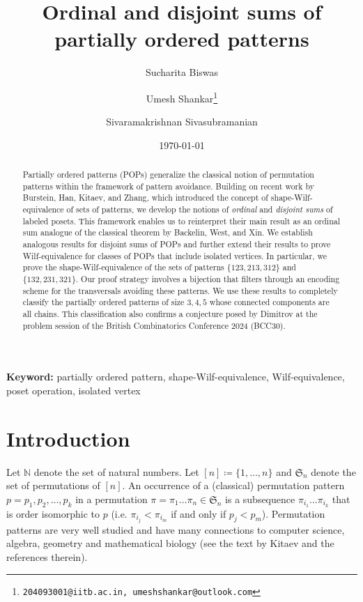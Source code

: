 \documentclass[12pt, english, a4paper]{article}
\title{Ordinal and disjoint sums of partially ordered patterns}
\author[1]{Sucharita Biswas}
\author[2]{Umesh Shankar\thanks{\tt{204093001@iitb.ac.in, umeshshankar@outlook.com}}}
\author[3]{Sivaramakrishnan Sivasubramanian}
\affil[1,2,3]{Department of Mathematics, Indian Institute of Technology, Bombay Mumbai 400076, India}
\date{\today}
\newcommand{\SSS}{\mathfrak{S}}
\newcommand{\N}{\mathbb{N}}
\theoremstyle{plain}
\theoremstyle{definition}
\theoremstyle{remark}
\begin{document}
\maketitle
\begin{abstract}
Partially ordered patterns (POPs) generalize the classical notion of permutation patterns within the framework of pattern avoidance. Building on recent work by Burstein, Han, Kitaev, and Zhang, which introduced the concept of shape-Wilf-equivalence of sets of patterns, we develop the notions of \emph{ordinal} and \emph{disjoint sums} of labeled posets. This framework enables us to reinterpret their main result as an ordinal sum analogue of the classical theorem by Backelin, West, and Xin. We establish analogous results for disjoint sums of POPs and further extend their results to prove Wilf-equivalence for classes of POPs that include isolated vertices. In particular, we prove the shape-Wilf-equivalence of the sets of patterns $\{123, 213, 312\}$ and $\{132, 231, 321\}$. Our proof strategy involves a bijection that filters through an encoding scheme for the transversals avoiding these patterns.  We use these results to completely classify the partially ordered patterns of size $3,4,5$ whose connected components are all chains. This classification also confirms a conjecture posed by Dimitrov at the problem session of the British Combinatorics Conference 2024 (BCC30).
\end{abstract}
\textbf{\small{}Keyword:}{\small{} partially ordered pattern, shape-Wilf-equivalence, Wilf-equivalence, poset operation, isolated vertex  }{\let\thefootnote\relax{}}
\section{Introduction}

Let $\N$ denote the set of natural numbers. Let $[n] \coloneqq \{1,\dots,n\}$ and $\SSS_n$ denote the set of permutations of $[n]$. 
An occurrence of a (classical) permutation pattern $p=p_1,p_2,\ldots, p_k$ in a permutation $\pi=\pi_1\dots\pi_n \in \SSS_n$ is a subsequence $\pi_{i_1}\dots\pi_{i_k}$ that is order isomorphic to $p$ (i.e. $\pi_{i_j}<\pi_{i_m}$ if and only if $p_j<p_m$). Permutation patterns are very well studied and have many connections to computer science, algebra, geometry and mathematical biology (see the text by Kitaev \cite{kitaev-patterns-words} and the references therein).   
\end{document}
